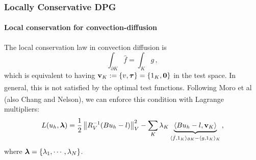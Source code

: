 \documentclass[18pt,xcolor=table]{beamer}
\newcounter{nn}
\begin{document}

%                                                                                                                      
%                                                                                                                      
%     
\begin{frame}
\frametitle{Locally Conservative DPG}
\framesubtitle{Local conservation for convection-diffusion}
The local conservation law in convection diffusion is
\[
\int_{\partial K}\hat f=\int_K g\,,
\]
which is equivalent to having $\mathbf{v}_K:=\{v,\boldsymbol\tau\}=\{1_K,\boldsymbol0\}$ in the test space.
In general, this is not satisfied by the optimal test functions.
Following Moro et al\textsuperscript{\cite{MoroNguyenPeraire11}} (also
Chang and Nelson\textsuperscript{\cite{ChangNelson1997}}), we
can enforce this condition with Lagrange multipliers:
\begin{align*}
L(u_h,\boldsymbol\lambda) = \frac{1}{2}\left\| R_V^{-1}(Bu_h-l) \right\|_V^2
-\sum_K\lambda_K\underbrace{\langle Bu_h-l,\mathbf{v}_K\rangle}_
{\langle\hat f, 1_K\rangle_{\partial K}-\langle g,1_K\rangle_K}\,,
\end{align*}
where $\boldsymbol\lambda=\{\lambda_1,\cdots,\lambda_N\}$.
\end{frame}
\end{document}
